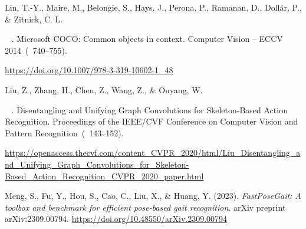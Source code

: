 \documentclass[pdflatex,iicol,sn-apa]{sn-jnl}
\begin{document}
\begin{thebibliography}{}
%
\begin{APACrefauthors}%
Lin, T.-Y., Maire, M., Belongie, S., Hays, J., Perona, P., Ramanan, D., Doll{\'a}r, P., \& Zitnick, C. L.
\end{APACrefauthors}%
\unskip\
\newblock
{}.
\newblock
{\BBOQ} {Microsoft
  {COCO}: Common objects in context}.{\BBCQ}
\newblock
  {{Computer Vision -- ECCV
  2014}}\ (\BPGS\ 740--755).
\newblock
\begin{APACrefURL} {\url{https://doi.org/10.1007/978-3-319-10602-1_48}}
  \end{APACrefURL}
\PrintBackRefs{\CurrentBib}

%
\begin{APACrefauthors}%
Liu, Z., Zhang, H., Chen, Z., Wang, Z., \& Ouyang, W.
\end{APACrefauthors}%
\unskip\
\newblock
{}.
\newblock
{\BBOQ} {{Disentangling and Unifying Graph
  Convolutions for Skeleton-Based Action Recognition}}.{\BBCQ}
\newblock
  {{Proceedings of the IEEE/CVF Conference on Computer
  Vision and Pattern Recognition}}\ (\BPGS\ 143--152).
\newblock
\begin{APACrefURL}
  {\url{https://openaccess.thecvf.com/content_CVPR_2020/html/Liu_Disentangling_and_Unifying_Graph_Convolutions_for_Skeleton-Based_Action_Recognition_CVPR_2020_paper.html}}
  \end{APACrefURL}
\PrintBackRefs{\CurrentBib}

Meng, S., Fu, Y., Hou, S., Cao, C., Liu, X., \& Huang, Y. (2023).
\textit{FastPoseGait: A toolbox and benchmark for efficient pose-based gait recognition}.
arXiv preprint arXiv:2309.00794. \url{https://doi.org/10.48550/arXiv.2309.00794}


\end{thebibliography}
\end{document}
